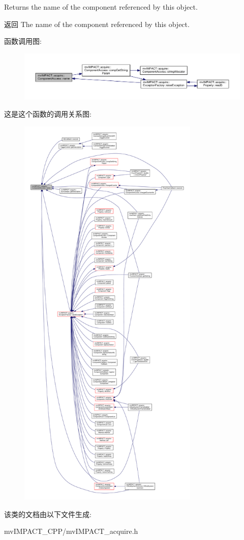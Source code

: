 Returns the name of the component referenced by this object. 

\begin{DoxyReturn}{返回}
The name of the component referenced by this object. 
\end{DoxyReturn}


函数调用图\+:
\nopagebreak
\begin{figure}[H]
\begin{center}
\leavevmode
\includegraphics[width=350pt]{classmv_i_m_p_a_c_t_1_1acquire_1_1_component_access_aee8b40bfc45b5752e03570afaadce217_cgraph}
\end{center}
\end{figure}




这是这个函数的调用关系图\+:
\nopagebreak
\begin{figure}[H]
\begin{center}
\leavevmode
\includegraphics[height=550pt]{classmv_i_m_p_a_c_t_1_1acquire_1_1_component_access_aee8b40bfc45b5752e03570afaadce217_icgraph}
\end{center}
\end{figure}




该类的文档由以下文件生成\+:\begin{DoxyCompactItemize}
\item 
mv\+I\+M\+P\+A\+C\+T\+\_\+\+C\+P\+P/mv\+I\+M\+P\+A\+C\+T\+\_\+acquire.\+h\end{DoxyCompactItemize}
